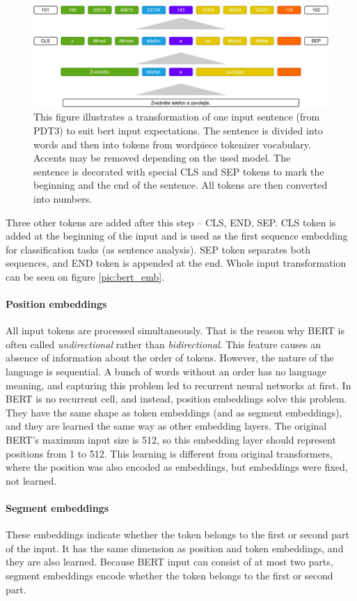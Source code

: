 \begin{figure}[h]
\centering
\includegraphics[width=1\columnwidth]{../img/bert_input}
\protect\caption{This figure illustrates a transformation of one input sentence (from PDT3) to suit bert input expectations. The sentence is divided into words and then into tokens from wordpiece tokenizer vocabulary. Accents may be removed depending on the used model. The sentence is decorated with special CLS and SEP tokens to mark the beginning and the end of the sentence. All tokens are then converted into numbers. }
\label{pic:bert_inp}
\end{figure}
\par
Three other tokens are added after this step -- CLS, END, SEP. 
CLS token is added at the beginning of the input and is used as the first sequence embedding for classification tasks (as sentence analysis). SEP token separates both sequences, and END token is appended at the end. Whole input transformation can be seen on figure \ref{pic:bert_emb}.
\paragraph{Position embeddings}
All input tokens are processed simultaneously. That is the reason why BERT is often called \textit{undirectional} rather than \textit{bidirectional}. This feature causes an absence of information about the order of tokens. However, the nature of the language is sequential. A bunch of words without an order has no language meaning, and capturing this problem led to recurrent neural networks at first. In BERT is no recurrent cell, and instead, position embeddings solve this problem. They have the same shape as token embeddings (and as segment embeddings), and they are learned the same way as other embedding layers. The original BERT's maximum input size is 512, so this embedding layer should represent positions from 1 to 512. This learning is different from original transformers, where the position was also encoded as embeddings, but embeddings were fixed, not learned.
\paragraph{Segment embeddings}
These embeddings indicate whether the token belongs to the first or second part of the input. It has the same dimension as position and token embeddings, and they are also learned. Because BERT input can consist of at most two parts, segment embeddings encode whether the token belongs to the first or second part.

